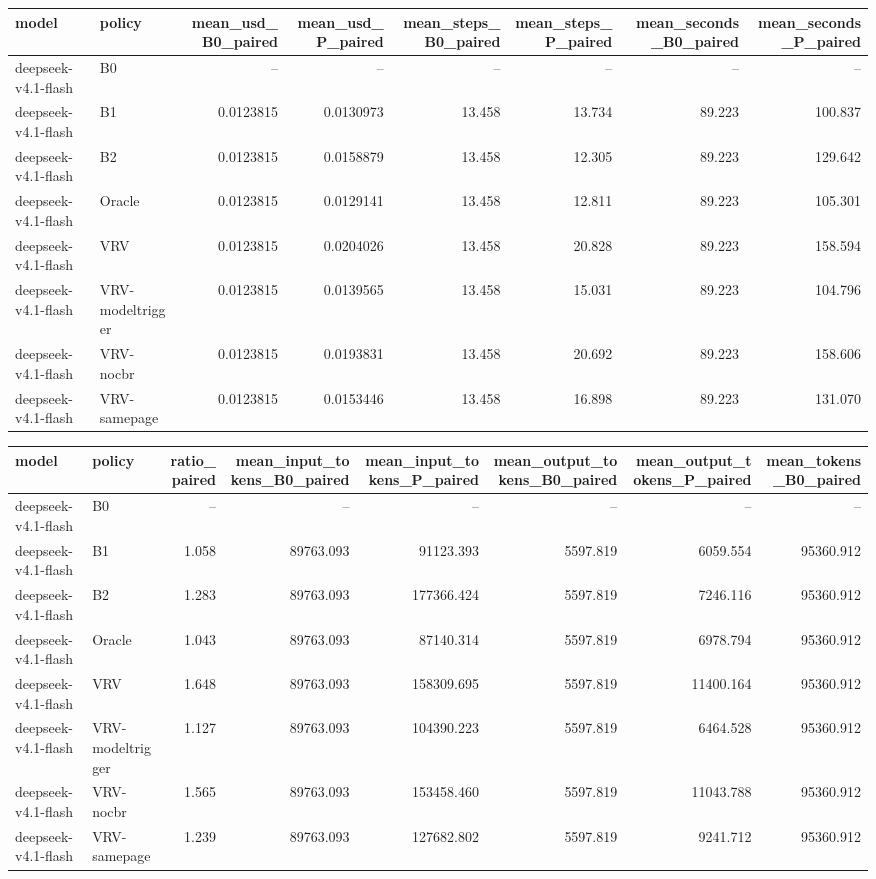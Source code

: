 \begin{tabular}{llrrrrrr}
\toprule
model & policy & mean\_usd\_B0\_paired & mean\_usd\_P\_paired & mean\_steps\_B0\_paired & mean\_steps\_P\_paired & mean\_seconds\_B0\_paired & mean\_seconds\_P\_paired \\
\midrule
deepseek-v4.1-flash & B0 & -- & -- & -- & -- & -- & -- \\
deepseek-v4.1-flash & B1 & 0.0123815 & 0.0130973 & 13.458 & 13.734 & 89.223 & 100.837 \\
deepseek-v4.1-flash & B2 & 0.0123815 & 0.0158879 & 13.458 & 12.305 & 89.223 & 129.642 \\
deepseek-v4.1-flash & Oracle & 0.0123815 & 0.0129141 & 13.458 & 12.811 & 89.223 & 105.301 \\
deepseek-v4.1-flash & VRV & 0.0123815 & 0.0204026 & 13.458 & 20.828 & 89.223 & 158.594 \\
deepseek-v4.1-flash & VRV-modeltrigger & 0.0123815 & 0.0139565 & 13.458 & 15.031 & 89.223 & 104.796 \\
deepseek-v4.1-flash & VRV-nocbr & 0.0123815 & 0.0193831 & 13.458 & 20.692 & 89.223 & 158.606 \\
deepseek-v4.1-flash & VRV-samepage & 0.0123815 & 0.0153446 & 13.458 & 16.898 & 89.223 & 131.070 \\
\bottomrule
\end{tabular}

\begin{tabular}{llrrrrrr}
\toprule
model & policy & ratio\_paired & mean\_input\_tokens\_B0\_paired & mean\_input\_tokens\_P\_paired & mean\_output\_tokens\_B0\_paired & mean\_output\_tokens\_P\_paired & mean\_tokens\_B0\_paired \\
\midrule
deepseek-v4.1-flash & B0 & -- & -- & -- & -- & -- & -- \\
deepseek-v4.1-flash & B1 & 1.058 & 89763.093 & 91123.393 & 5597.819 & 6059.554 & 95360.912 \\
deepseek-v4.1-flash & B2 & 1.283 & 89763.093 & 177366.424 & 5597.819 & 7246.116 & 95360.912 \\
deepseek-v4.1-flash & Oracle & 1.043 & 89763.093 & 87140.314 & 5597.819 & 6978.794 & 95360.912 \\
deepseek-v4.1-flash & VRV & 1.648 & 89763.093 & 158309.695 & 5597.819 & 11400.164 & 95360.912 \\
deepseek-v4.1-flash & VRV-modeltrigger & 1.127 & 89763.093 & 104390.223 & 5597.819 & 6464.528 & 95360.912 \\
deepseek-v4.1-flash & VRV-nocbr & 1.565 & 89763.093 & 153458.460 & 5597.819 & 11043.788 & 95360.912 \\
deepseek-v4.1-flash & VRV-samepage & 1.239 & 89763.093 & 127682.802 & 5597.819 & 9241.712 & 95360.912 \\
\bottomrule
\end{tabular}


